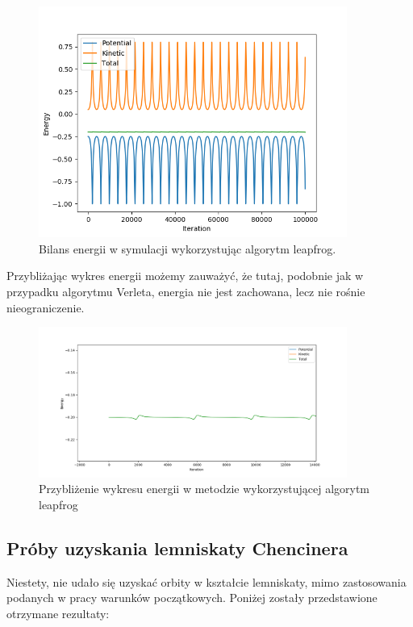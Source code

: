 \documentclass[10pt,a4paper]{article}
\begin{document}
	\begin{figure}[htp!!!!!!!]	
		\begin{center}
			\includegraphics[width = 0.9\textwidth]{leapfrog_energy.png}
			\caption{Bilans energii w symulacji wykorzystując algorytm leapfrog.}
			\label{schemat}
		\end{center}
	\end{figure} 
	
	Przybliżając wykres energii możemy zauważyć, że tutaj, podobnie jak w przypadku
	algorytmu Verleta, energia nie jest zachowana, lecz nie rośnie nieograniczenie.
	
	\begin{figure}[htp!!!!!!!]	
		\begin{center}
			\includegraphics[width = 0.9\textwidth]{leapfrog_energy_closeup.png}
			\caption{Przybliżenie wykresu energii w metodzie wykorzystującej 
					 algorytm leapfrog}
			\label{schemat}
		\end{center}
	\end{figure} 
	
	
\subsection*{Próby uzyskania lemniskaty Chencinera}
Niestety, nie udało się uzyskać orbity w kształcie lemniskaty, mimo zastosowania
podanych w pracy \cite{zrodlo1} warunków początkowych. Poniżej zostały przedstawione 
otrzymane rezultaty:
\end{document}
